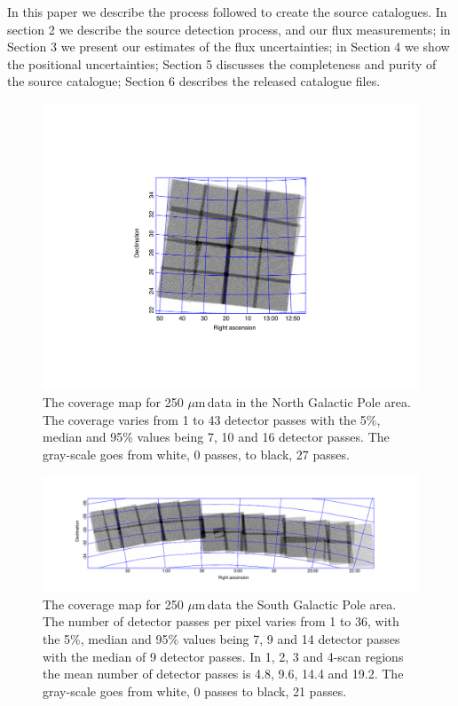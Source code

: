 \documentclass[useAMS,usenatbib]{mn2e}
\def\mic{ $\mu $m\,}
\begin{document}
In this paper we describe the process followed to create the
source catalogues. In section 2 we describe the source detection
process, and our flux measurements; in Section 3 we present our
estimates of the flux uncertainties; in Section 4 we show the
positional uncertainties; Section 5 discusses the completeness and
purity of the source catalogue; Section 6 describes the released
catalogue files. 


\begin{figure} %
\includegraphics[scale=0.7]{ngpcoverage.pdf}
\caption{\protect\label{skymapn} The coverage map for 250\mic data
  in the North Galactic Pole area. The coverage varies from 1 to 43
  detector passes with the 5\%, median and 95\% values being 7, 10 and
  16 detector passes. The gray-scale goes from white, 0 passes, to
  black, 27 passes.}

\end{figure}

\begin{figure} %
\includegraphics[scale=1.]{sgpcoverage.pdf}
\caption{ \protect\label{skymaps} The coverage map for 250\mic data
  the South Galactic Pole area.  The number of detector passes per
  pixel varies from 1 to 36, with the 5\%, median and 95\% values
  being 7, 9 and 14 detector passes with the median of 9 detector
  passes. In 1, 2, 3 and 4-scan regions the mean number of detector
  passes is 4.8, 9.6, 14.4 and 19.2. The gray-scale goes from white, 0
  passes to black, 21 passes.  }

\end{figure}
\end{document}
